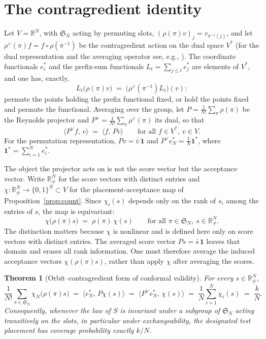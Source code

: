 \documentclass[11pt]{article}
\newtheorem{theorem}{Theorem}
\theoremstyle{remark}
\newcommand{\R}{\mathbb{R}}
\begin{document}
\section{The contragredient identity}\label{sec:contra}

Let $V=\R^{N}$, with $\mathfrak S_{N}$ acting by permuting slots,
$(\rho(\pi)v)_j=v_{\pi^{-1}(j)}$, and let $\rho^{\vee}(\pi)f=f\circ\rho(\pi^{-1})$ be the
contragredient action on the dual space $V^{*}$ (for the dual representation and the averaging
operator see, e.g., \citealp{serre1977}). The coordinate functionals $e^{*}_{i}$ and the
prefix-sum functionals $L_t=\sum_{j\le t}e^{*}_{j}$ are elements of $V^{*}$, and one has,
exactly,
\begin{equation}\label{eq:contra}
L_t\bigl(\rho(\pi)v\bigr)\;=\;\bigl(\rho^{\vee}(\pi^{-1})L_t\bigr)(v):
\end{equation}
permute the points holding the prefix functional fixed, or hold the points fixed and permute the
functional. Averaging over the group, let $P=\frac1{N!}\sum_{\pi}\rho(\pi)$ be the Reynolds
projector and $P^{\vee}=\frac1{N!}\sum_{\pi}\rho^{\vee}(\pi)$ its dual, so that
\begin{equation}\label{eq:reynolds}
\langle P^{\vee}f,\,v\rangle\;=\;\langle f,\,Pv\rangle
\qquad\text{for all } f\in V^{*},\ v\in V .
\end{equation}
For the permutation representation, $Pv=\bar v\,\mathbf 1$ and
$P^{\vee}e^{*}_{N}=\frac1N\mathbf 1^{*}$, where $\mathbf 1^{*}=\sum_{i=1}^{N}e^{*}_{i}$.

The object the projector acts on is not the score vector but the acceptance vector. Write
$\R^{N}_{\ne}$ for the score vectors with distinct entries and
$\chi:\R^{N}_{\ne}\to\{0,1\}^{N}\subset V$ for the placement-acceptance map of
Proposition~\ref{prop:count}. Since $\chi_i(s)$ depends only on the rank of $s_i$ among the
entries of $s$, the map is equivariant:
\begin{equation}\label{eq:equivariant}
\chi\bigl(\rho(\pi)s\bigr)\;=\;\rho(\pi)\,\chi(s)
\qquad\text{for all }\pi\in\mathfrak S_{N},\ s\in\R^{N}_{\ne}.
\end{equation}
The distinction matters because $\chi$ is nonlinear and is defined here only on score vectors
with distinct entries. The averaged score vector $Ps=\bar s\,\mathbf 1$ leaves that domain and
erases all rank information. One must therefore average the induced acceptance vectors
$\chi(\rho(\pi)s)$, rather than apply $\chi$ after averaging the scores.

\begin{theorem}[Orbit--contragredient form of conformal validity]\label{thm:orbit}
For every $s\in\R^{N}_{\ne}$,
\[
\frac1{N!}\sum_{\pi\in\mathfrak S_{N}}\chi_{N}\bigl(\rho(\pi)s\bigr)
\;=\;\langle e^{*}_{N},\,P\chi(s)\rangle
\;=\;\langle P^{\vee}e^{*}_{N},\,\chi(s)\rangle
\;=\;\frac1N\sum_{i=1}^{N}\chi_i(s)
\;=\;\frac{k}{N}.
\]
Consequently, whenever the law of $S$ is invariant under a subgroup of $\mathfrak S_{N}$ acting
transitively on the slots, in particular under exchangeability, the designated test placement
has coverage probability exactly $k/N$.
\end{theorem}
\end{document}
